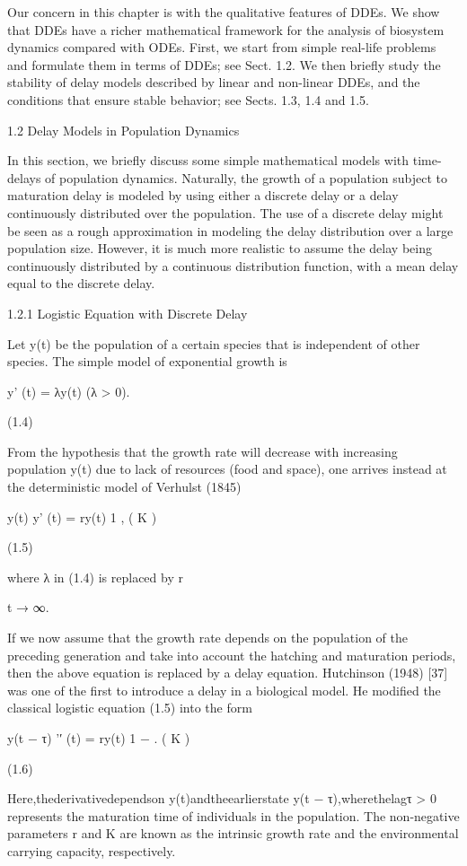 \documentclass[12pt]{article}
\begin{document}
Our concern in this chapter is with the qualitative features of DDEs. We show that DDEs have a richer mathematical framework for the analysis 
of biosystem dynamics compared with ODEs. First, we start from simple real-life problems and formulate them in terms of DDEs; see Sect. 1.2. 
We then brieﬂy study the stability of delay models described by linear and non-linear DDEs, and the conditions that ensure stable behavior; 
see Sects. 1.3, 1.4 and 1.5.

1.2 Delay Models in Population Dynamics

In this section, we brieﬂy discuss some simple mathematical models with time-delays of population dynamics. Naturally, the growth of a 
population subject to maturation delay is modeled by using either a discrete delay or a delay continuously distributed over the population. 
The use of a discrete delay might be seen as a rough approximation in modeling the delay distribution over a large population size. However, 
it is much more realistic to assume the delay being continuously distributed by a continuous distribution function, with a mean delay equal 
to the discrete delay.

1.2.1 Logistic Equation with Discrete Delay

Let y(t) be the population of a certain species that is independent of other species. The simple model of exponential growth is

y' (t) = λy(t) (λ > 0).

(1.4)

From the hypothesis that the growth rate will decrease with increasing population y(t) due to lack of resources (food and space), one arrives 
instead at the deterministic model of Verhulst (1845)

y(t) y' (t) = ry(t) 1 , ( K )

(1.5)

where λ in (1.4) is replaced by r

t → ∞.

If we now assume that the growth rate depends on the population of the preceding generation and take into account the hatching and maturation 
periods, then the above equation is replaced by a delay equation. Hutchinson (1948) [37] was one of the first to introduce a delay in a 
biological model. He modified the classical logistic equation (1.5) into the form

y(t − τ) '′ (t) = ry(t) 1 − . ( K )

(1.6)

Here,thederivativedependson y(t)andtheearlierstate y(t − τ),wherethelagτ > 0 represents the maturation time of individuals in the 
population. The non-negative parameters r and K are known as the intrinsic growth rate and the environmental carrying capacity, respectively.
\end{document}
